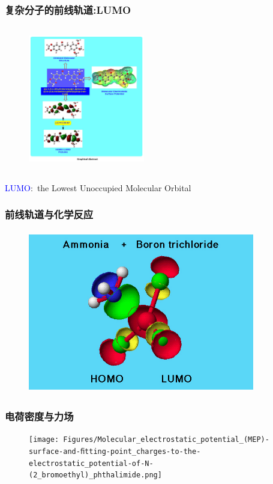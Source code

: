 \frame
{
	\frametitle{复杂分子的前线轨道:\textrm{LUMO}}
\begin{figure}[h!]
\centering
\vspace{-10.5pt}
\includegraphics[height=2.50in,width=2.00in,viewport=0 40 750 850,clip]{Figures/HOMO-LUMO.jpg}
\label{HOMO-LUMO:LUMO}
\end{figure}
\textrm{\textcolor{blue}{LUMO}:~the Lowest Unoccupied Molecular Orbital}
}

\frame
{
	\frametitle{前线轨道与化学反应}
\begin{figure}[h!]
\centering
\vspace{-10.5pt}
\includegraphics[height=2.80in,width=3.90in,viewport=0 0 550 400,clip]{Figures/NH3_BCl3_HOMO_LUMO_orient.jpg}
\label{HOMO-LUMO}
\end{figure}
}

\frame
{
	\frametitle{电荷密度与力场}
\begin{figure}[h!]
\centering
\vspace{-10.5pt}
\texttt{[image: Figures/Molecular\_electrostatic\_potential\_(MEP)-surface-and-ﬁtting-point\_charges-to-the-electrostatic\_potential-of-N-(2\_bromoethyl)\_phthalimide.png]}
\label{MO-potential_density}
\end{figure}
}

